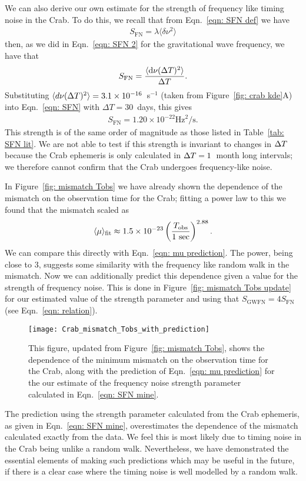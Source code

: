 \documentclass[../full_thesis/full_thesis.tex]{subfiles}
\begin{document}
We can also derive our own estimate for the strength of frequency like timing noise
in the Crab. To do this, we recall that from Eqn.~\eqref{eqn: SFN def} we have
\begin{align}
S_{\textrm{FN}} = \lambda \langle \delta \nu^{2}\rangle
\end{align}
then, as we did in Eqn.~\eqref{eqn: SFN 2} for the gravitational wave frequency,
we have that
\begin{align}
S_{\textrm{FN}} = \frac{\langle \mathrm{d} \nu(\Delta T)^{2} \rangle }{\Delta T}.
\label{eqn: SFN}
\end{align}
Substituting
$\langle d\nu(\Delta T)^2 \rangle =3.1\times10^{-16}$~s$^{-1}$ (taken from Figure~\ref{fig: crab
kde}A) into Eqn.~\eqref{eqn: SFN} with $\Delta T = 30$~days, this gives
\begin{align}
S_{\mathrm{FN}} = 1.20 \times 10^{-22} \textrm{Hz}^{2}/\textrm{s}.
\label{eqn: SFN mine}
\end{align}
This strength is of the
same order of magnitude as those listed in Table~\ref{tab: SFN lit}. We are not
able to test if this strength is invariant to changes in $\Delta T$ because the
Crab ephemeris is only calculated in $\Delta T=1$~month long intervals; we therefore
cannot confirm that the Crab undergoes frequency-like noise.

In Figure~\ref{fig: mismatch Tobs} we have already shown the dependence of the
mismatch on the observation time for the Crab; fitting a power law to this
we found that the mismatch scaled as
\begin{align}
\langle \mu \rangle_{\textrm{fit}} \approx 1.5 \times 10^{-23}
\left(\frac{T_{\mathrm{obs}}}{1 \textrm{ sec}}\right)^{2.88}.
\end{align}
We can compare this directly with Eqn.~\eqref{eqn: mu prediction}. The power,
being close to $3$, suggests some similarity with the frequency like random
walk in the mismatch.  Now we can additionally predict this dependence given a
value for the strength of frequency noise. This is done in Figure~\ref{fig:
mismatch Tobs update} for our estimated value of the strength parameter and
using that $S_{\textrm{GWFN}} = 4S_\textrm{FN}$ (see Eqn.~\eqref{eqn:
relation}).
\begin{figure}[htb]
\centering
\texttt{[image: Crab\_mismatch\_Tobs\_with\_prediction]}
\caption{This figure, updated from Figure~\ref{fig: mismatch Tobs}, shows the
dependence of the minimum mismatch on the observation time for the Crab, along
with the prediction of Eqn.~\eqref{eqn: mu prediction} for the our estimate of
the frequency noise strength parameter calculated in Eqn.~\eqref{eqn: SFN mine}.}
\label{fig: mismatch Tobs update}
\end{figure}
The prediction using the strength parameter calculated from the Crab ephemeris,
as given in Eqn.~\eqref{eqn: SFN mine}, overestimates the dependence of the
mismatch calculated exactly from the data. We feel this is most likely due to timing
noise in the Crab being unlike a random walk. Nevertheless, we have
demonstrated the essential elements of making such predictions which may be useful
in the future, if there is a clear case where the timing noise is well
modelled by a random walk.
\end{document}

